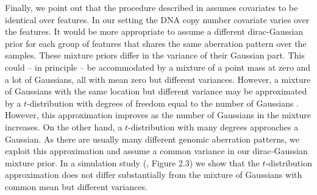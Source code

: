 Finally, we point out that the procedure described in \cite{Mark2013} assumes covariates to be identical over features. In our setting the DNA copy number covariate varies over the features. It would be more appropriate to assume a different dirac-Gaussian prior for each group of features that shares the same aberration pattern over the samples. These mixture priors differ in the variance of their Gaussian part. This could -- in principle -- be accommodated by a mixture of a point mass at zero and a lot of Gaussians, all with mean zero but different variances. However, a mixture of Gaussians with the same location but different variance may be approximated by a $t$-distribution with degrees of freedom equal to the number of Gaussians \cite{Peel2000}. However, this approximation improves as the number of Gaussians in the mixture increases. On the other hand, a $t$-distribution with many degrees approaches a Gaussian. As there are usually many different genomic aberration patterns, we exploit this approximation and assume a common variance in our dirac-Gaussian mixture prior. In a simulation study (\cite{Supp2018}, Figure 2.3) we show that the $t$-distribution approximation does not differ substantially from the mixture of Gaussians with common mean but different variances.

